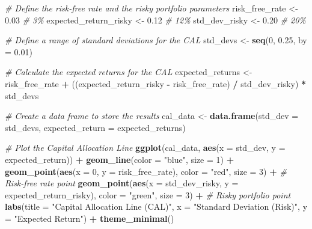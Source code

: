 \documentclass[
]{book}
\newenvironment{Shaded}{\begin{snugshade}}{\end{snugshade}}
\newcommand{\AttributeTok}[1]{\textcolor[rgb]{0.13,0.29,0.53}{#1}}
\newcommand{\CommentTok}[1]{\textcolor[rgb]{0.56,0.35,0.01}{\textit{#1}}}
\newcommand{\DecValTok}[1]{\textcolor[rgb]{0.00,0.00,0.81}{#1}}
\newcommand{\FloatTok}[1]{\textcolor[rgb]{0.00,0.00,0.81}{#1}}
\newcommand{\FunctionTok}[1]{\textcolor[rgb]{0.13,0.29,0.53}{\textbf{#1}}}
\newcommand{\NormalTok}[1]{#1}
\newcommand{\OtherTok}[1]{\textcolor[rgb]{0.56,0.35,0.01}{#1}}
\newcommand{\SpecialCharTok}[1]{\textcolor[rgb]{0.81,0.36,0.00}{\textbf{#1}}}
\newcommand{\StringTok}[1]{\textcolor[rgb]{0.31,0.60,0.02}{#1}}
\begin{document}
\begin{Shaded}
\begin{Highlighting}[]
\CommentTok{\# Define the risk{-}free rate and the risky portfolio parameters}
\NormalTok{risk\_free\_rate }\OtherTok{\textless{}{-}} \FloatTok{0.03}  \CommentTok{\# 3\%}
\NormalTok{expected\_return\_risky }\OtherTok{\textless{}{-}} \FloatTok{0.12}  \CommentTok{\# 12\%}
\NormalTok{std\_dev\_risky }\OtherTok{\textless{}{-}} \FloatTok{0.20}  \CommentTok{\# 20\%}

\CommentTok{\# Define a range of standard deviations for the CAL}
\NormalTok{std\_devs }\OtherTok{\textless{}{-}} \FunctionTok{seq}\NormalTok{(}\DecValTok{0}\NormalTok{, }\FloatTok{0.25}\NormalTok{, }\AttributeTok{by =} \FloatTok{0.01}\NormalTok{)}

\CommentTok{\# Calculate the expected returns for the CAL}
\NormalTok{expected\_returns }\OtherTok{\textless{}{-}}\NormalTok{ risk\_free\_rate }\SpecialCharTok{+}\NormalTok{ ((expected\_return\_risky }\SpecialCharTok{{-}}\NormalTok{ risk\_free\_rate) }\SpecialCharTok{/}\NormalTok{ std\_dev\_risky) }\SpecialCharTok{*}\NormalTok{ std\_devs}

\CommentTok{\# Create a data frame to store the results}
\NormalTok{cal\_data }\OtherTok{\textless{}{-}} \FunctionTok{data.frame}\NormalTok{(}\AttributeTok{std\_dev =}\NormalTok{ std\_devs, }\AttributeTok{expected\_return =}\NormalTok{ expected\_returns)}

\CommentTok{\# Plot the Capital Allocation Line}
\FunctionTok{ggplot}\NormalTok{(cal\_data, }\FunctionTok{aes}\NormalTok{(}\AttributeTok{x =}\NormalTok{ std\_dev, }\AttributeTok{y =}\NormalTok{ expected\_return)) }\SpecialCharTok{+}
  \FunctionTok{geom\_line}\NormalTok{(}\AttributeTok{color =} \StringTok{"blue"}\NormalTok{, }\AttributeTok{size =} \DecValTok{1}\NormalTok{) }\SpecialCharTok{+}
  \FunctionTok{geom\_point}\NormalTok{(}\FunctionTok{aes}\NormalTok{(}\AttributeTok{x =} \DecValTok{0}\NormalTok{, }\AttributeTok{y =}\NormalTok{ risk\_free\_rate), }\AttributeTok{color =} \StringTok{"red"}\NormalTok{, }\AttributeTok{size =} \DecValTok{3}\NormalTok{) }\SpecialCharTok{+}  \CommentTok{\# Risk{-}free rate point}
  \FunctionTok{geom\_point}\NormalTok{(}\FunctionTok{aes}\NormalTok{(}\AttributeTok{x =}\NormalTok{ std\_dev\_risky, }\AttributeTok{y =}\NormalTok{ expected\_return\_risky), }\AttributeTok{color =} \StringTok{"green"}\NormalTok{, }\AttributeTok{size =} \DecValTok{3}\NormalTok{) }\SpecialCharTok{+}  \CommentTok{\# Risky portfolio point}
  \FunctionTok{labs}\NormalTok{(}\AttributeTok{title =} \StringTok{"Capital Allocation Line (CAL)"}\NormalTok{,}
       \AttributeTok{x =} \StringTok{"Standard Deviation (Risk)"}\NormalTok{,}
       \AttributeTok{y =} \StringTok{"Expected Return"}\NormalTok{) }\SpecialCharTok{+}
  \FunctionTok{theme\_minimal}\NormalTok{()}
\end{Highlighting}
\end{Shaded}
\end{document}
